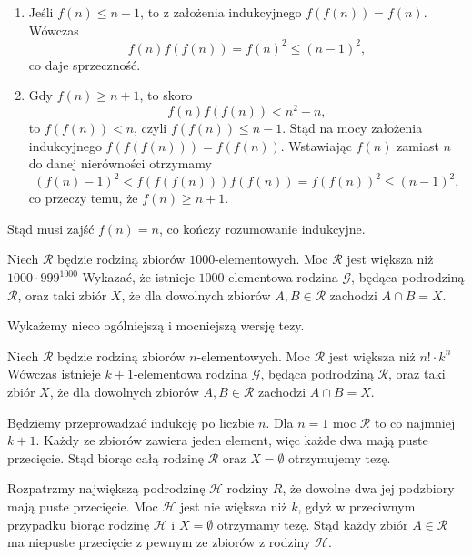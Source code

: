\begin{enumerate}
	\item Jeśli $f(n) \leqslant n - 1$, to z założenia indukcyjnego $f(f(n)) = f(n)$. Wówczas
	\[
		f(n)f(f(n)) = f(n)^2 \leqslant (n - 1)^2,
	\]
	co daje sprzeczność.
	\item Gdy $f(n) \geqslant n + 1$, to skoro
	\[
		f(n)f(f(n)) < n^2 + n,
	\]
	to $f(f(n)) < n$, czyli $f(f(n)) \leqslant n - 1$. Stąd na mocy założenia indukcyjnego $f(f(f(n))) = f(f(n))$. Wstawiając $f(n)$ zamiast $n$ do danej nierówności otrzymamy
	\[
		(f(n) - 1)^2 < f(f(f(n)))f(f(n)) = f(f(n))^2 \leqslant (n - 1)^2,
	\]
	co przeczy temu, że $f(n) \geqslant n + 1$.
\end{enumerate}

\noindent
Stąd musi zajść $f(n) = n$, co kończy rozumowanie indukcyjne.

\begin{problem}{6}
	Niech $\mathcal{R}$ będzie rodziną zbiorów $1000$-elementowych. Moc $\mathcal{R}$ jest większa niż $1000 \cdot 999^{1000}$ Wykazać, że istnieje $1000$-elementowa rodzina $\mathcal{G}$, będąca podrodziną $\mathcal{R}$, oraz taki zbiór $X$, że dla dowolnych zbiorów $A, B \in \mathcal{R}$ zachodzi $A \cap B = X$.
\end{problem}

\noindent
Wykażemy nieco ogólniejszą i mocniejszą wersję tezy.

\vspace{10px}

\noindent
Niech $\mathcal{R}$ będzie rodziną zbiorów $n$-elementowych. Moc $\mathcal{R}$ jest większa niż $n! \cdot k^{n}$ Wówczas istnieje $k+1$-elementowa rodzina $\mathcal{G}$, będąca podrodziną $\mathcal{R}$, oraz taki zbiór $X$, że dla dowolnych zbiorów $A, B \in \mathcal{R}$ zachodzi $A \cap B = X$.

\vspace{10px}

\noindent
Będziemy przeprowadzać indukcję po liczbie $n$. Dla $n = 1$ moc $\mathcal{R}$ to co najmniej $k + 1$. Każdy ze zbiorów zawiera jeden element, więc każde dwa mają puste przecięcie. Stąd biorąc całą rodzinę $\mathcal{R}$ oraz $X = \emptyset$ otrzymujemy tezę.

\vspace{10px}

\noindent
Rozpatrzmy największą podrodzinę $\mathcal{H}$ rodziny $R$, że dowolne dwa jej podzbiory mają puste przecięcie. Moc $\mathcal{H}$ jest nie większa niż $k$, gdyż w przeciwnym przypadku biorąc rodzinę $\mathcal{H}$ i $X = \emptyset$ otrzymamy tezę. Stąd każdy zbiór $A \in \mathcal{R}$ ma niepuste przecięcie z pewnym ze zbiorów z rodziny $\mathcal{H}$.

